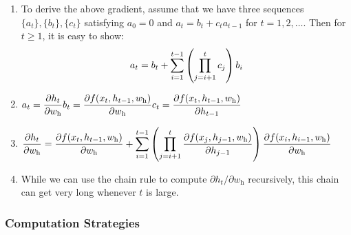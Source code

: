 \begin{enumerate}[itemsep=0.2cm]
    \item To derive the above gradient, assume that we have three sequences $\{a_{t}\},\{b_{t}\},\{c_{t}\}$ satisfying $a_{0}=0$ and $a_{t}=b_{t}+c_{t}a_{t-1}$ for $t=1, 2,\ldots$. Then for $t\geq 1$, it is easy to show:
    \[
        \hfill
        a_{t}=b_{t}+\dsum_{i=1}^{t-1}\left(\dprod_{j=i+1}^{t}c_{j}\right)b_{i}
        \hfill
    \]


    \item $
        \hfill
        a_t = \dfrac{\partial h_t}{\partial w_\textrm{h}}
        \hfill
        b_t = \dfrac{\partial f(x_{t},h_{t-1},w_\textrm{h})}{\partial w_\textrm{h}}
        \hfill
        c_t = \dfrac{\partial f(x_{t},h_{t-1},w_\textrm{h})}{\partial h_{t-1}}
        \hfill
    $

    \item $
        \dfrac{\partial h_t}{\partial w_\textrm{h}}=\dfrac{\partial f(x_{t},h_{t-1},w_\textrm{h})}{\partial w_\textrm{h}}+\displaystyle\sum_{i=1}^{t-1}\left(\displaystyle\prod_{j=i+1}^{t} \dfrac{\partial f(x_{j},h_{j-1},w_\textrm{h})}{\partial h_{j-1}} \right) \dfrac{\partial f(x_{i},h_{i-1},w_\textrm{h})}{\partial w_\textrm{h}}
    $

    \item While we can use the chain rule to compute $\partial h_t/\partial w_\textrm{h}$ recursively, this chain can get very long whenever $t$ is large.

    
\end{enumerate}


\subsubsection*{Computation Strategies \cite{dnn-1}}

